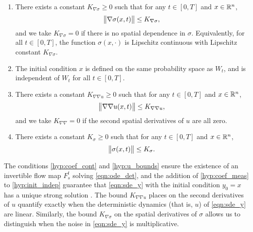 \begin{hypo}
\begin{enumerate}[label=(H.\arabic{*}), ref=H.\arabic{*}]
		\item\label{hyp:sigma_deriv_bound} There exists a constant \(K_{\nabla\sigma} \geq 0\) such that for any \(t \in [0,T]\) and \(x \in \mathbb{R}^n\),
		\begin{equation*}
			\norm{\nabla\sigma(x,t)} \leq K_{\nabla\sigma},
		\end{equation*}
		and we take \(K_{\nabla\sigma} = 0\) if there is no spatial dependence in \(\sigma\).
		Equivalently, for all \(t \in [0,T]\), the function \(\sigma\!\left(x, \cdot\right)\) is Lipschitz continuous with Lipschitz constant \(K_{\nabla\sigma}\).

		\item\label{hyp:init_indep} The initial condition \(x\) is defined on the same probability space as \(W_t\), and is independent of \(W_t\) for all \(t \in [0,T]\).

		\item\label{hyp:nnu_bounds} There exists a constant \(K_{\nabla\nabla u} \geq 0\) such that for any \(t \in [0,T]\) and \(x \in \mathbb{R}^n\),
		\[
			\norm{\nabla \nabla u(x,t)} \leq K_{\nabla\nabla u},
		\]
		and we take \(K_{\nabla\nabla} = 0\) if the second spatial derivatives of \(u\) are all zero.

		\item\label{hyp:sigma_bounds} There exists a constant \(K_\sigma \geq 0\) such that for any \(t \in [0,T]\) and \(x \in \mathbb{R}^n\),
		\begin{equation*}
			\norm{\sigma(x,t)} \leq K_{\sigma}.
		\end{equation*}

	\end{enumerate}
\end{hypo}
The conditions \ref{hyp:coef_cont} and \ref{hyp:u_bounds} ensure the existence of an invertible flow map \(F_s^t\) solving \eqref{eqn:ode_det}, and the addition of \ref{hyp:coef_meas} to \ref{hyp:init_indep} guarantee that \eqref{eqn:sde_y} with the initial condition \(y_0 = x\) has a unique strong solution \cite{KallianpurSundar_2014_StochasticAnalysisDiffusion}.
The bound \(K_{\nabla\nabla u}\) places on the second derivatives of \(u\) quantify exactly when the deterministic dynamics (that is, \(u\)) of \eqref{eqn:sde_y} are linear.
Similarly, the bound \(K_{\nabla\sigma}\) on the spatial derivatives of \(\sigma\) allows us to distinguish when the noise in \eqref{eqn:sde_y} is multiplicative.

